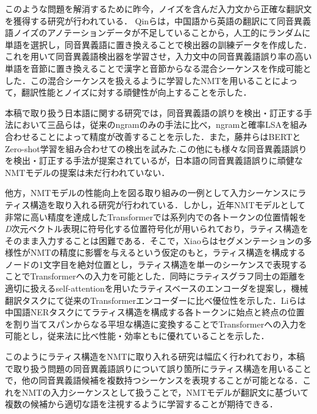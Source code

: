 \documentclass[a4j,10.5pt, twocolumn]{jarticle}
\begin{document}
このような問題を解消するために昨今，ノイズを含んだ入力文から正確な翻訳文を獲得する研究が行われている．
Qinら\cite{Qin}は，中国語から英語の翻訳にて同音異義語ノイズのアノテーションデータが不足していることから，人工的にランダムに単語を選択し，同音異義語に置き換えることで検出器の訓練データを作成した．これを用いて同音異義語検出器を学習させ，入力文中の同音異義語誤り率の高い単語を音節に置き換えることで漢字と音節からなる混合シーケンスを作成可能とした．この混合シーケンスを扱えるように学習したNMTを用いることによって，翻訳性能とノイズに対する頑健性が向上することを示した．

本稿で取り扱う日本語に関する研究では，同音異義語の誤りを検出・訂正する手法において三品ら\cite{Mishina}は，従来のngramのみの手法に比べ，ngramと確率LSAを組み合わせることによって精度が改善することを示した．また，藤井ら\cite{Fujii}はBERTとZero-shot学習を組み合わせての検出を試みた.この他にも様々な同音異義語誤りを検出・訂正する手法が提案されているが，日本語の同音異義語誤りに頑健なNMTモデルの提案は未だ行われていない．

他方，NMTモデルの性能向上を図る取り組みの一例として入力シーケンスにラティス構造を取り入れる研究が行われている．しかし，近年NMTモデルとして非常に高い精度を達成したTransformerでは系列内での各トークンの位置情報を\textit{D}次元ベクトル表現に符号化する位置符号化が用いられており\cite{Vaswani}，ラティス構造をそのまま入力することは困難である\cite{Xiao}．そこで，Xiaoら\cite{Xiao}はセグメンテーションの多様性がNMTの精度に影響を与えるという仮定のもと，ラティス構造を構成するノードの1文字目を絶対位置とし，ラティス構造を単一のシーケンスで表現することでTransformerへの入力を可能とした．同時にラティスグラフ同士の距離を適切に扱えるself-attentionを用いたラティスベースのエンコーダを提案し，機械翻訳タスクにて従来のTransformerエンコーダーに比べ優位性を示した．Liら\cite{Li}は中国語NERタスクにてラティス構造を構成する各トークンに始点と終点の位置を割り当てスパンからなる平坦な構造に変換することでTransformerへの入力を可能とし，従来法に比べ性能・効率ともに優れていることを示した．

このようにラティス構造をNMTに取り入れる研究は幅広く行われており，本稿で取り扱う問題の同音異義語誤りについて誤り箇所にラティス構造を用いることで，他の同音異義語候補を複数持つシーケンスを表現することが可能となる．これをNMTの入力シーケンスとして扱うことで，NMTモデルが翻訳文に基づいて複数の候補から適切な語を注視するように学習することが期待できる．
\end{document}
